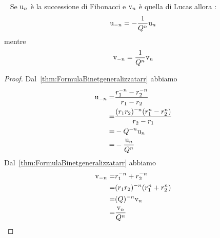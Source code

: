 \begin{thm}\label{thm:FormulaBinetgeneralizzatavalneg}~\cite{Rabinowitz_1996}
	Se $\mathrm{u}_{n}$ è la successione di Fibonacci e  $\mathrm{v}_{n}$ è quella di Lucas
	allora : \begin{equation}
		\mathrm{u}_{-n}=-\dfrac{1}{Q^n}	\mathrm{u}_{n}
	\end{equation}
	mentre \begin{equation}
		\mathrm{v}_{-n}=\dfrac{1}{Q^n}	\mathrm{v}_{n}
	\end{equation}
\end{thm}
\begin{proof}
	Dal~\vref{thm:FormulaBinetgeneralizzatarr} abbiamo
	\begin{align*}
		\mathrm{u}_{-n}= & {}\dfrac{r_{1}^{-n}-r_{2}^{-n}}{r_{1}-r_{2}}              \\
		=        & {}\dfrac{(r_1r_2)^{-n}(r_{1}^{n}-r_{2}^{n})}{r_{2}-r_{1}} \\
		=        & {}-Q^{-n}\mathrm{u}_{n}                                           \\
		=        & {}-\dfrac{\mathrm{u}_{n}}{Q^{n}}                                  \\
	\end{align*}
	Dal~\vref{thm:FormulaBinetgeneralizzatarr} abbiamo
	\begin{align*}
		\mathrm{v}_{-n}= & {}r_{1}^{-n}+r_{2}^{-n}              \\
		=        & {}(r_1r_2)^{-n}(r_{1}^{n}+r_{2}^{n}) \\
		=        & {}(Q)^{-n}\mathrm{v}_{n}                     \\
		=        & {}\dfrac{\mathrm{v}_{n}}{Q^n}
	\end{align*}
\end{proof}
